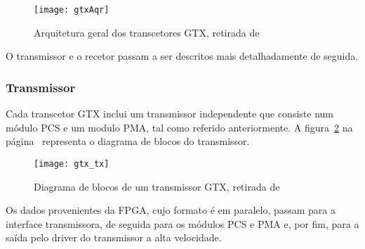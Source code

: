 \begin{figure}[h!]
	\begin{center}
		\leavevmode
		\texttt{[image: gtxAqr]}
		\caption{Arquitetura geral dos transcetores GTX, retirada de \cite{R010}}
		\label{fig:GTXarquitetura}
	\end{center}
\end{figure}

O transmissor e o recetor passam a ser descritos mais detalhadamente de seguida.

\subsubsection{Transmissor}
Cada transcetor GTX inclui um transmissor independente que consiste num módulo PCS e um modulo PMA, tal como referido anteriormente. A figura~\ref{fig:gtx_tx} na página~\pageref{fig:gtx_tx} representa o diagrama de blocos do transmissor.
\begin{figure}[h!]
	\begin{center}
		\leavevmode
		\texttt{[image: gtx\_tx]}
		\caption{Diagrama de blocos de um transmissor GTX, retirada de \cite{R011}}
		\label{fig:gtx_tx}
	\end{center}
\end{figure}

Os dados provenientes da FPGA, cujo formato é em paralelo, passam para a interface transmissora, de seguida para os módulos PCS e PMA e, por fim, para a saída pelo driver do transmissor a alta velocidade. 

